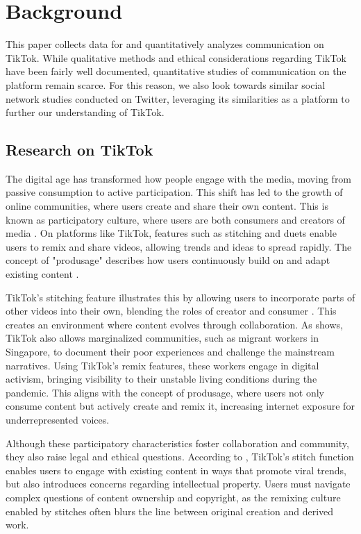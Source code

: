 \chapter{Background}

This paper collects data for and quantitatively analyzes communication on TikTok. While qualitative methods and ethical considerations regarding TikTok have been fairly well documented, quantitative studies of communication on the platform remain scarce. For this reason, we also look towards similar social network studies conducted on Twitter, leveraging its similarities as a platform to further our understanding of TikTok.


\section{Research on TikTok}

The digital age has transformed how people engage with the media, moving from passive consumption to active participation. This shift has led to the growth of online communities, where users create and share their own content. This is known as participatory culture, where users are both consumers and creators of media \citep{jenkins2015participatory}. On platforms like TikTok, features such as stitching and duets enable users to remix and share videos, allowing trends and ideas to spread rapidly. The concept of "produsage" describes how users continuously build on and adapt existing content \citep{bruns2008blogs}.

TikTok’s stitching feature illustrates this by allowing users to incorporate parts of other videos into their own, blending the roles of creator and consumer \citep{tiktok_stitch_2020}. This creates an environment where content evolves through collaboration. As \cite{kaur2022customization} shows, TikTok also allows marginalized communities, such as migrant workers in Singapore, to document their poor experiences and challenge the mainstream narratives. Using TikTok's remix features, these workers engage in digital activism, bringing visibility to their unstable living conditions during the pandemic. This aligns with the concept of produsage, where users not only consume content but actively create and remix it, increasing internet exposure for underrepresented voices.

Although these participatory characteristics foster collaboration and community, they also raise legal and ethical questions. According to \cite{ripplexn2023stitch}, TikTok’s stitch function enables users to engage with existing content in ways that promote viral trends, but also introduces concerns regarding intellectual property. Users must navigate complex questions of content ownership and copyright, as the remixing culture enabled by stitches often blurs the line between original creation and derived work.

